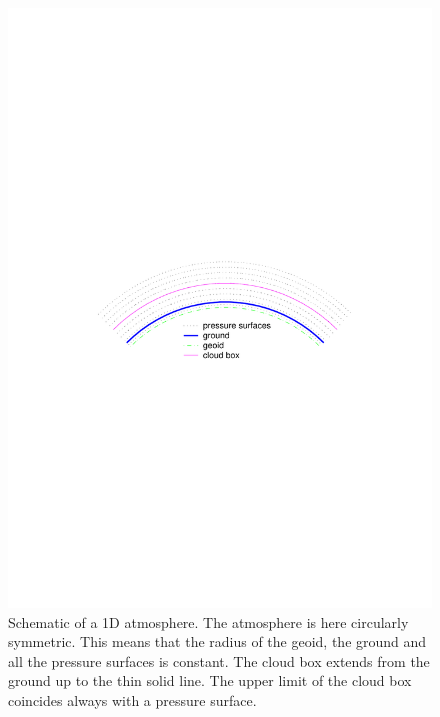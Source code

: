  \begin{figure}
  \begin{center}
   \includegraphics*[width=0.95\hsize]{Figs/atm_dim_1d}
   \caption{ Schematic of a 1D atmosphere. The atmosphere is here circularly
     symmetric. This means that the radius of the geoid, the ground
     and all the pressure surfaces is constant. The cloud box extends
     from the ground up to the thin solid line. The upper limit of
     the cloud box coincides always with a pressure surface. }
   \label{fig:fm_defs:1d}  
  \end{center}
 \end{figure}

